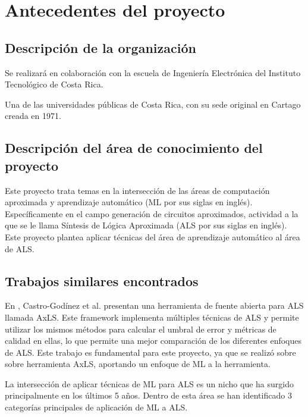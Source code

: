 \section{Antecedentes del proyecto}

\subsection{Descripción de la organización}

Se realizará en colaboración con la escuela de Ingeniería Electrónica del
Instituto Tecnológico de Costa Rica.

Una de las universidades públicas de Costa Rica, con su sede original en
Cartago creada en 1971.

\subsection{Descripción del área de conocimiento del proyecto}

Este proyecto trata temas en la intersección de las áreas de computación
aproximada y aprendizaje automático (ML por sus siglas en inglés).
Específicamente en el campo generación de circuitos aproximados, actividad a la
que se le llama Síntesis de Lógica Aproximada (ALS por sus siglas en inglés).
Este proyecto plantea aplicar técnicas del área de aprendizaje automático al
área de ALS.

\subsection{Trabajos similares encontrados}

En \cite{castro-godinez_axls_2021}, Castro-Godínez et al. presentan una
herramienta de fuente abierta para ALS llamada AxLS. Este framework implementa
múltiples técnicas de ALS y permite utilizar los mismos métodos para calcular
el umbral de error y métricas de calidad en ellas, lo que permite una mejor
comparación de los diferentes enfoques de ALS. Este trabajo es fundamental para
este proyecto, ya que se realizó sobre sobre herramienta AxLS, aportando un
enfoque de ML a la herramienta.

La intersección de aplicar técnicas de ML para ALS es un nicho que ha surgido
principalmente en los últimos 5 años. Dentro de esta área se han identificado 3
categorías principales de aplicación de ML a ALS.

